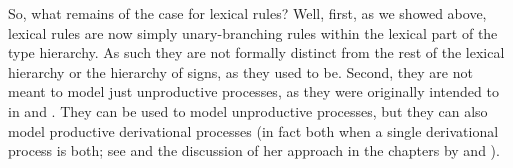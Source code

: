 \documentclass[output=paper,biblatex,babelshorthands,newtxmath,draftmode,colorlinks,citecolor=brown]{langscibook}
\begin{document}
So, what remains of the case for lexical rules? Well, first, as we showed above, lexical rules are now simply unary-branching rules within the lexical part of the type hierarchy. As such they are not formally distinct from the rest of the lexical hierarchy or the hierarchy of signs, as they used to be. Second, they are not meant to model just unproductive processes, as they were originally intended to in \citet{Jackendoff1975} and \citet{Bochner1993}.
They can be used to model unproductive processes, but they can also model productive derivational processes (in fact both when a single derivational process is both; see \citealt{Riehemann98a} and the discussion of her approach in the chapters by  and ).
\end{document}
